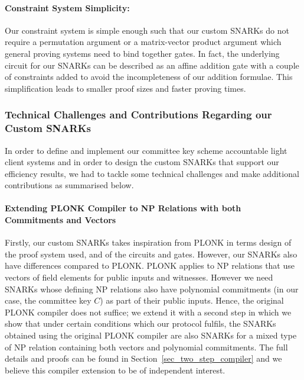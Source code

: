 \vspace{-0.05in}
\paragraph{Constraint System Simplicity: }Our constraint system is simple enough such that our custom SNARKs do not require a permutation argument or a matrix-vector product argument 
which general proving systems need to bind together gates. In fact, the underlying circuit for our SNARKs can be described as an affine addition gate with a couple of constraints added to avoid the incompleteness of our addition formulae. This simplification leads to smaller proof sizes  and faster proving times.

\subsubsection{Technical Challenges and Contributions Regarding our Custom SNARKs} 
\label{sec:technical_challenges}

In order to define and implement our committee key scheme accountable light client systems and in order to design the custom SNARKs that support our efficiency results, 
we had to tackle some technical challenges and make additional contributions as summarised below.

\paragraph{Extending PLONK Compiler to NP Relations with both Commitments and Vectors} Firstly, our custom SNARKs takes inspiration from PLONK \cite{plonk} in terms design of the proof system used, 
and of the circuits and gates. However, our SNARKs also have differences compared to PLONK. PLONK applies to NP relations  that use  vectors of field elements for 
public inputs and witnesses.  However we need SNARKs whose defining NP relations also have  polynomial commitments (in our case, the committee key $C$) 
as part of their public inputs. Hence, the original PLONK compiler does not suffice; we extend it with a second step in which we show that under certain 
conditions which our protocol fulfils, the SNARKs obtained using the original PLONK compiler are also SNARKs for a mixed type of NP relation 
containing both vectors and polynomial commitments. The full details and proofs can be found in Section~\ref{sec_two_step_compiler} 
and we believe this compiler extension to be of independent interest. 

